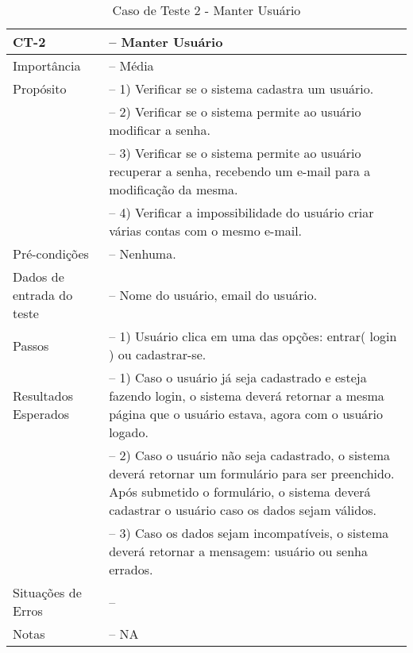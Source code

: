 \begin{anexosenv}
\begin{longtable}{p{4cm}>{-- }p{9cm}}
  \caption{Caso de Teste 2 - Manter Usuário}\label{tab:ct2} \\
  \toprule
  \noindent
  CT-2                      & Manter Usuário \\ \midrule
  Importância               & Média \\ \midrule
  Propósito                 & 1) Verificar se o sistema cadastra um usuário.\\
                            & 2) Verificar se o sistema permite ao usuário modificar a senha.\\
                            & 3) Verificar se o sistema permite ao usuário recuperar a senha, recebendo um e-mail para a modificação da mesma.\\
                            & 4) Verificar a impossibilidade do usuário criar várias contas com o mesmo e-mail.\\ \midrule
  Pré-condições             & Nenhuma.\\ \midrule
  Dados de entrada do teste & Nome do usuário, email do usuário.\\ \midrule
  Passos                    & 1) Usuário clica em uma das opções: entrar( login ) ou cadastrar-se.\\ \midrule
  Resultados Esperados      & 1) Caso o usuário já seja cadastrado e esteja fazendo login, o sistema deverá retornar a mesma página que o usuário estava, agora com o usuário logado.\\
                            & 2) Caso o usuário não seja cadastrado, o sistema deverá retornar um formulário para ser preenchido. Após submetido o formulário, o sistema deverá cadastrar o usuário caso os dados sejam válidos.\\
                            & 3) Caso os dados sejam incompatíveis, o sistema deverá retornar a mensagem: usuário ou senha errados.\\ \midrule
  Situações de Erros        &                                 \\ \midrule
  Notas                     & NA                              \\ \bottomrule
\end{longtable}


\end{anexosenv}
